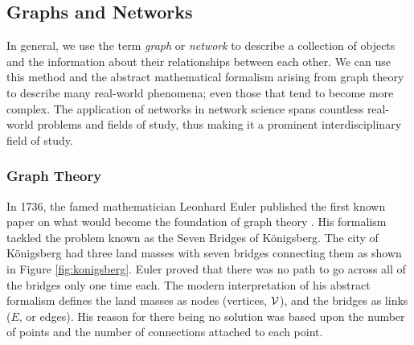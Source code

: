 \subsection{Graphs and Networks} \label{intro-network}
 In general, we use the term \textit{graph} or \textit{network} to describe a collection of objects and the information about their relationships between each other. We can use this method and the abstract mathematical formalism arising from graph theory to describe many real-world phenomena; even those that tend to become more complex. The application of networks in network science spans countless real-world problems and fields of study, thus making it a prominent interdisciplinary field of study. 
 

\subsubsection{Graph Theory} \label{intro-net-graph}

In 1736, the famed mathematician Leonhard Euler published the first known paper on what would become the foundation of graph theory \citep{Euler1736}. His formalism tackled the problem known as the Seven Bridges of Königsberg. The city of Königsberg had three land masses with seven bridges connecting them as shown in Figure \ref{fig:konigsberg}. Euler proved that there was no path to go across all of the bridges only one time each. The modern interpretation of his abstract formalism defines the land masses as nodes (vertices, $\mathcal{V}$), and the bridges as links ($E$, or edges). His reason for there being no solution was based upon the number of points and the number of connections attached to each point. 


